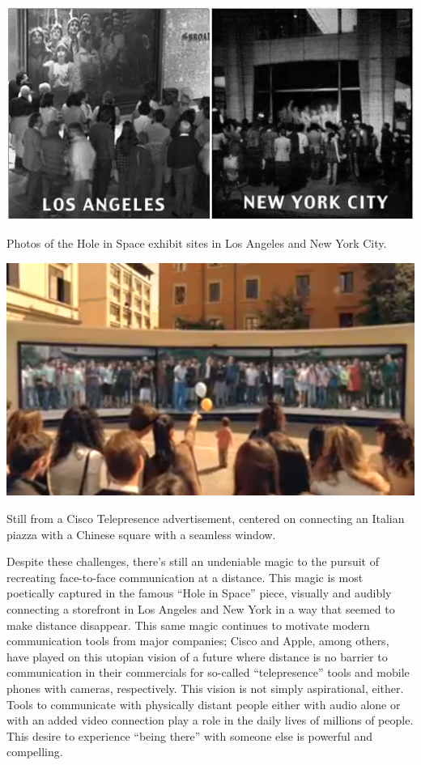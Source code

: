 

\begin{marginfigure}
	\includegraphics{figures/hole_in_space.jpg}
	\caption{Photos of the Hole in Space exhibit sites in Los Angeles and New York City.}
	\label{fig:hole-in-space}
\end{marginfigure}

\begin{marginfigure}
	\includegraphics{figures/cisco-telepresence.png}
	\caption{Still from a Cisco Telepresence advertisement, centered on connecting an Italian piazza with a Chinese square with a seamless window.}
	\label{fig:cisco-telepresence}
\end{marginfigure}

Despite these challenges, there's still an undeniable magic to the pursuit of recreating face-to-face communication at a distance. This magic is most poetically captured in the famous ``Hole in Space'' \citep{HoleinSpace:1980vn} piece, visually and audibly connecting a storefront in Los Angeles and New York in a way that seemed to make distance disappear. This same magic continues to motivate modern communication tools from major companies; Cisco and Apple, among others, have played on this utopian vision of a future where distance is no barrier to communication in their commercials for so-called ``telepresence'' tools and mobile phones with cameras, respectively. This vision is not simply aspirational, either. Tools to communicate with physically distant people either with audio alone or with an added video connection play a role in the daily lives of millions of people. This desire to experience ``being there'' with someone else is powerful and compelling. 


